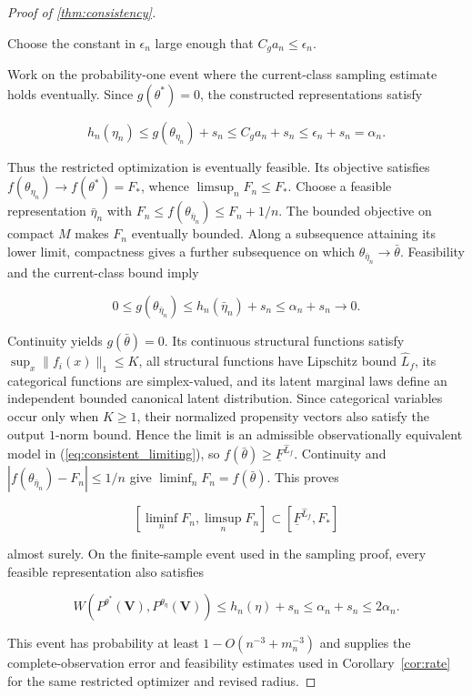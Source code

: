 \begin{proof}[Proof of \cref{thm:consistency}]
\begin{enumerate}
Choose the constant in $\epsilon_n$ large enough that $C_ga_n\leqslant\epsilon_n$.
\end{enumerate}
Work on the probability-one event where the current-class sampling estimate holds eventually. Since $g(\theta^*)=0$, the constructed representations satisfy

\[
h_n(\eta_n)\leqslant g(\theta_{\eta_n})+s_n\leqslant C_ga_n+s_n\leqslant\epsilon_n+s_n=\alpha_n.
\]

Thus the restricted optimization is eventually feasible. Its objective satisfies $f(\theta_{\eta_n})\rightarrow f(\theta^*)=F_*$, whence $\limsup_nF_n\leqslant F_*$. Choose a feasible representation $\bar\eta_n$ with $F_n\leqslant f(\theta_{\bar\eta_n})\leqslant F_n+1/n$. The bounded objective on compact $M$ makes $F_n$ eventually bounded. Along a subsequence attaining its lower limit, compactness gives a further subsequence on which $\theta_{\bar\eta_n}\rightarrow\bar\theta$. Feasibility and the current-class bound imply

\[
0\leqslant g(\theta_{\bar\eta_n})\leqslant h_n(\bar\eta_n)+s_n\leqslant\alpha_n+s_n\rightarrow0.
\]

Continuity yields $g(\bar\theta)=0$. Its continuous structural functions satisfy $\sup_x\|f_i(x)\|_1\leqslant K$, all structural functions have Lipschitz bound $\hat L_f$, its categorical functions are simplex-valued, and its latent marginal laws define an independent bounded canonical latent distribution. Since categorical variables occur only when $K\geqslant1$, their normalized propensity vectors also satisfy the output $1$-norm bound. Hence the limit is an admissible observationally equivalent model in (\ref{eq:consistent_limiting}), so $f(\bar\theta)\geqslant\underline F^{\hat L_f}$. Continuity and $|f(\theta_{\bar\eta_n})-F_n|\leqslant1/n$ give $\liminf_nF_n=f(\bar\theta)$. This proves

\[
[\liminf_nF_n,\limsup_nF_n]\subset[\underline F^{\hat L_f},F_*]
\]

almost surely. On the finite-sample event used in the sampling proof, every feasible representation also satisfies

\[
W(P^{\theta^*}(\boldsymbol V),P^{\theta_\eta}(\boldsymbol V))\leqslant h_n(\eta)+s_n\leqslant\alpha_n+s_n\leqslant2\alpha_n.
\]

This event has probability at least $1-O(n^{-3}+m_n^{-3})$ and supplies the complete-observation error and feasibility estimates used in Corollary~\ref{cor:rate} for the same restricted optimizer and revised radius. 
\end{proof}

